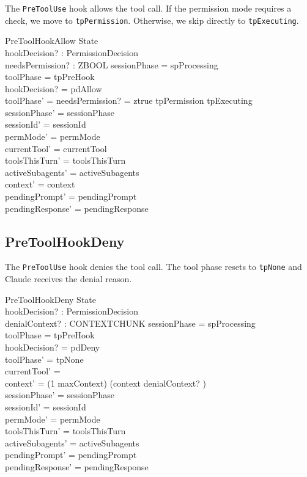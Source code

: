 \documentclass[a4paper,10pt,fleqn]{article}
\begin{document}
The \texttt{PreToolUse} hook allows the tool call. If the permission
mode requires a check, we move to \texttt{tpPermission}. Otherwise,
we skip directly to \texttt{tpExecuting}.

\begin{schema}{PreToolHookAllow}
  \Delta State \\
  hookDecision? : PermissionDecision \\
  needsPermission? : ZBOOL
  \where
  sessionPhase = spProcessing \\
  toolPhase = tpPreHook \\
  hookDecision? = pdAllow \\
  toolPhase' = \IF needsPermission? = ztrue \THEN tpPermission \ELSE tpExecuting \\
  sessionPhase' = sessionPhase \\
  sessionId' = sessionId \\
  permMode' = permMode \\
  currentTool' = currentTool \\
  toolsThisTurn' = toolsThisTurn \\
  activeSubagents' = activeSubagents \\
  context' = context \\
  pendingPrompt' = pendingPrompt \\
  pendingResponse' = pendingResponse
\end{schema}

\subsection{PreToolHookDeny}

The \texttt{PreToolUse} hook denies the tool call. The tool phase
resets to \texttt{tpNone} and Claude receives the denial reason.

\begin{schema}{PreToolHookDeny}
  \Delta State \\
  hookDecision? : PermissionDecision \\
  denialContext? : CONTEXTCHUNK
  \where
  sessionPhase = spProcessing \\
  toolPhase = tpPreHook \\
  hookDecision? = pdDeny \\
  toolPhase' = tpNone \\
  currentTool' = \emptyset \\
  context' = (1 \upto maxContext) \dres (context \cat \langle denialContext? \rangle) \\
  sessionPhase' = sessionPhase \\
  sessionId' = sessionId \\
  permMode' = permMode \\
  toolsThisTurn' = toolsThisTurn \\
  activeSubagents' = activeSubagents \\
  pendingPrompt' = pendingPrompt \\
  pendingResponse' = pendingResponse
\end{schema}
\end{document}

